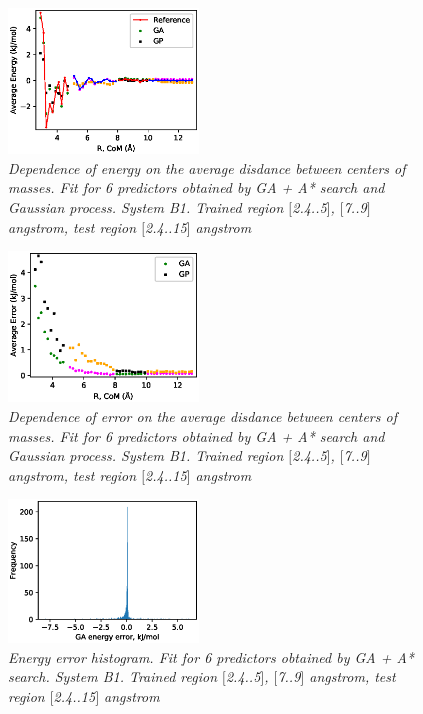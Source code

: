 \documentclass[aps,prl,reprint,amsmath,amssymb,nature]{revtex4-1}
\begin{document}
\begin{figure}[h]
\centering
\includegraphics[width=0.45\textwidth]{media/B1_gap_Energy_6_predictors.eps}
\caption{\textit{Dependence of energy on the average disdance between centers of masses. Fit for 6 predictors obtained by GA + A* search and Gaussian process. System B1. Trained region $[$2.4..5$]$, 
$[$7..9$]$ angstrom, test region $[$2.4..15$]$ angstrom}}
\label{Fig:B1_gap_energy_6_predictors}
\end{figure}

\begin{figure}[h]
\centering
\includegraphics[width=0.45\textwidth]{media/B1_gap_Error_6_predictors.eps}
\caption{\textit{Dependence of error on the average disdance between centers of masses. Fit for 6 predictors obtained by GA + A* search and Gaussian process. System B1. Trained region $[$2.4..5$]$, 
$[$7..9$]$ angstrom, test region $[$2.4..15$]$ angstrom}}\label{Fig:B1_gap_RMSE_6_predictors}
\end{figure}

\begin{figure}[h]
\includegraphics[width=0.45\textwidth]{media/B1_gap_GA_energy_error_histogram_6_predictors.eps}
\caption{\textit{Energy error histogram. Fit for 6 predictors obtained by GA + A* search. System B1. Trained region $[$2.4..5$]$, 
$[$7..9$]$ angstrom, test region $[$2.4..15$]$ angstrom}}\label{Fig:B1_gap_histogram_6_predictors}
\end{figure}
\end{document}
